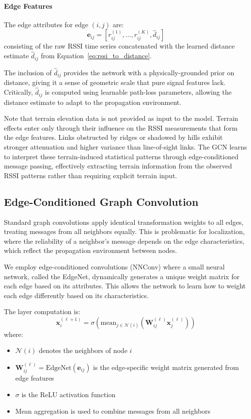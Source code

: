 \documentclass[master,final,11pt]{iscs-thesis}
\begin{document}
\paragraph{Edge Features}
The edge attributes for edge $(i, j)$ are:
\begin{equation}
    \mathbf{e}_{ij} = [r_{ij}^{(1)}, \ldots, r_{ij}^{(K)}, \hat{d}_{ij}]
\end{equation}
consisting of the raw RSSI time series concatenated with the learned distance estimate $\hat{d}_{ij}$ from Equation~\ref{eq:rssi_to_distance}.

The inclusion of $\hat{d}_{ij}$ provides the network with a physically-grounded prior on distance, giving it a sense of geometric scale that pure signal features lack.
Critically, $\hat{d}_{ij}$ is computed using learnable path-loss parameters, allowing the distance estimate to adapt to the propagation environment.

Note that terrain elevation data is not provided as input to the model.
Terrain effects enter only through their influence on the RSSI measurements that form the edge features. Links obstructed by ridges or shadowed by hills exhibit stronger attenuation and higher variance than line-of-sight links.
The GCN learns to interpret these terrain-induced statistical patterns through edge-conditioned message passing, effectively extracting terrain information from the observed RSSI patterns rather than requiring explicit terrain input.

\subsection{Edge-Conditioned Graph Convolution}

Standard graph convolutions apply identical transformation weights to all edges, treating messages from all neighbors equally.
This is problematic for localization, where the reliability of a neighbor's message depends on the edge characteristics, which reflect the propagation environment between nodes.

We employ edge-conditioned convolutions (NNConv) where a small neural network, called the EdgeNet, dynamically generates a unique weight matrix for each edge based on its attributes.
This allows the network to learn how to weight each edge differently based on its characteristics.

The layer computation is:
\begin{equation}
    \mathbf{x}_i^{(\ell+1)} = \sigma\left( \text{mean}_{j \in \mathcal{N}(i)} \left( \mathbf{W}_{ij}^{(\ell)} \mathbf{x}_j^{(\ell)} \right) \right)
    \label{eq:nnconv}
\end{equation}
where:
\begin{itemize}
    \item $\mathcal{N}(i)$ denotes the neighbors of node $i$
    \item $\mathbf{W}_{ij}^{(\ell)} = \text{EdgeNet}(\mathbf{e}_{ij})$ is the edge-specific weight matrix generated from edge features
    \item $\sigma$ is the ReLU activation function
    \item Mean aggregation is used to combine messages from all neighbors
\end{itemize}
\end{document}
